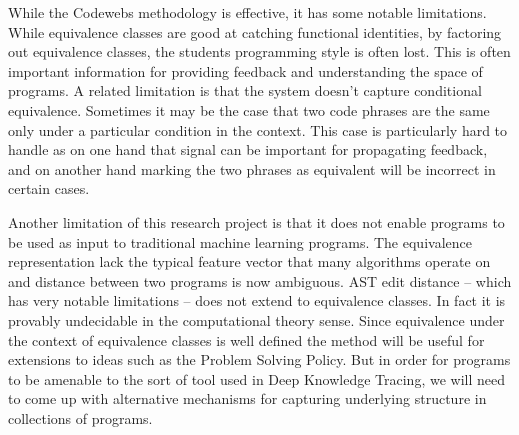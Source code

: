 While the Codewebs methodology is effective, it has some notable limitations. While equivalence classes are good at catching functional identities, by factoring out equivalence classes, the students programming style is often lost. This is often important information for providing feedback and understanding the space of programs. A related limitation is that the system doesn't capture conditional equivalence. Sometimes it may be the case that two code phrases are the same only under a particular condition in the context. This case is particularly hard to handle as on one hand that signal can be important for propagating feedback, and on another hand marking the two phrases as equivalent will be incorrect in certain cases. 

Another limitation of this research project is that it does not enable programs to be used as input to traditional machine learning programs. The equivalence representation lack the typical feature vector that many algorithms operate on and distance between two programs is now ambiguous. AST edit distance -- which has very notable limitations -- does not extend to equivalence classes. In fact it is provably undecidable in the computational theory sense. Since equivalence under the context of equivalence classes is well defined the method will be useful for extensions to ideas such as the Problem Solving Policy. But in order for programs to be amenable to the sort of tool used in Deep Knowledge Tracing, we will need to come up with alternative mechanisms for capturing underlying structure in collections of programs.



